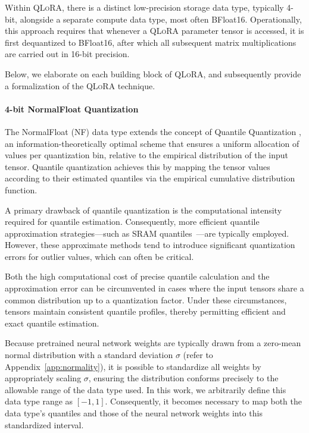 Within \textsc{QLoRA}, there is a distinct low-precision storage data type, typically 4-bit, alongside a separate compute data type, most often BFloat16. Operationally, this approach requires that whenever a \textsc{QLoRA} parameter tensor is accessed, it is first dequantized to BFloat16, after which all subsequent matrix multiplications are carried out in 16-bit precision.

Below, we elaborate on each building block of \textsc{QLoRA}, and subsequently provide a formalization of the \textsc{QLoRA} technique.

\paragraph{4-bit NormalFloat Quantization} The NormalFloat (NF) data type extends the concept of Quantile Quantization \citep{dettmers2022optimizers}, an information-theoretically optimal scheme that ensures a uniform allocation of values per quantization bin, relative to the empirical distribution of the input tensor. Quantile quantization achieves this by mapping the tensor values according to their estimated quantiles via the empirical cumulative distribution function.

A primary drawback of quantile quantization is the computational intensity required for quantile estimation. Consequently, more efficient quantile approximation strategies—such as SRAM quantiles~\citep{dettmers2022optimizers}—are typically employed. However, these approximate methods tend to introduce significant quantization errors for outlier values, which can often be critical.

Both the high computational cost of precise quantile calculation and the approximation error can be circumvented in cases where the input tensors share a common distribution up to a quantization factor. Under these circumstances, tensors maintain consistent quantile profiles, thereby permitting efficient and exact quantile estimation.

Because pretrained neural network weights are typically drawn from a zero-mean normal distribution with a standard deviation $\sigma$ (refer to Appendix~\ref{app:normality}), it is possible to standardize all weights by appropriately scaling $\sigma$, ensuring the distribution conforms precisely to the allowable range of the data type used. In this work, we arbitrarily define this data type range as $[-1, 1]$. Consequently, it becomes necessary to map both the data type’s quantiles and those of the neural network weights into this standardized interval.

